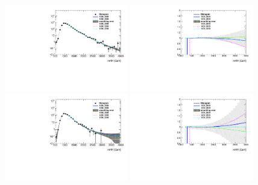
\begin{figure}[htbp!]
\begin{center}
\includegraphics[width=0.48\textwidth,angle=-90]{figures/boosted/Syst_Smooth/smoothFuncRangeCompare_22_comp.pdf}
\includegraphics[width=0.48\textwidth,angle=-90]{figures/boosted/Syst_Smooth/smoothFuncRangeCompare_22_comp_ratio.pdf} \\
\includegraphics[width=0.48\textwidth,angle=-90]{figures/boosted/Syst_Smooth/smoothFuncRangeCompare_33_comp.pdf}
\includegraphics[width=0.48\textwidth,angle=-90]{figures/boosted/Syst_Smooth/smoothFuncRangeCompare_33_comp_ratio.pdf} \\

\end{center}
\end{figure}
